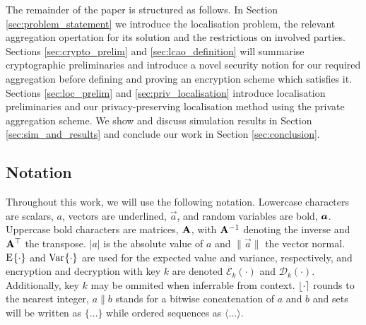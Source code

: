 \documentclass[twocolumn]{autart}
\begin{document}
The remainder of the paper is structured as follows. In Section \ref{sec:problem_statement} we introduce the localisation problem, the relevant aggregation opertation for its solution and the restrictions on involved parties. Sections \ref{sec:crypto_prelim} and \ref{sec:lcao_definition} will summarise cryptographic preliminaries and introduce a novel security notion for our required aggregation before defining and proving an encryption scheme which satisfies it. Sections \ref{sec:loc_prelim} and \ref{sec:priv_localisation} introduce localisation preliminaries and our privacy-preserving localisation method using the private aggregation scheme. We show and discuss simulation results in Section \ref{sec:sim_and_results} and conclude our work in Section \ref{sec:conclusion}.

% 
% 

\subsection{Notation}
Throughout this work, we will use the following notation. Lowercase characters are scalars, $a$, vectors are underlined, $\vec{a}$, and random variables are bold, ${\boldsymbol{a}}$. Uppercase bold characters are matrices, ${{\mathbf{A}}}$, with ${{\mathbf{A}}}^{-1}$ denoting the inverse and ${{\mathbf{A}}}^\top$ the transpose. $|a|$ is the absolute value of $a$ and $\lVert\vec{a}\rVert$ the vector normal. $\E{\cdot}$ and $\Var{\cdot}$ are used for the expected value and variance, respectively, and encryption and decryption with key $k$ are denoted $\mathcal{E}_{k}(\cdot)$ and $\mathcal{D}_{k}(\cdot)$. Additionally, key $k$ may be ommited when inferrable from context. $\lfloor\cdot\rceil$ rounds to the nearest integer, $a\|b$ stands for a bitwise concatenation of $a$ and $b$ and sets will be written as $\{\dots\}$ while ordered sequences as $\langle\dots\rangle$.

% 
%                              
%                              
%                              
% 
\end{document}
